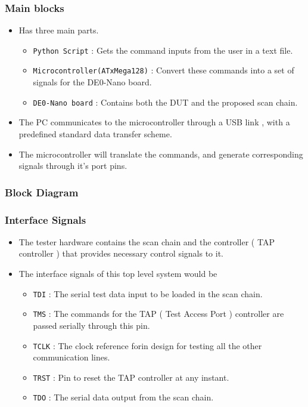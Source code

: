 \documentclass{beamer}
\begin{document}
\begin{frame}
\frametitle{Main blocks}

\begin{itemize}
\item Has three main parts.

\begin{itemize}
\item \texttt{Python Script} : Gets the command inputs from the user in a text file.
\item \texttt{Microcontroller(ATxMega128)} : Convert these commands into a set of signals for the DE0-Nano board.
\item \texttt{DE0-Nano board} : Contains both the DUT and the proposed scan chain.
\end{itemize}

\item The PC communicates to the microcontroller through a USB link , with a predefined standard data transfer scheme.
\item The microcontroller will translate the commands, and generate corresponding signals through it's port pins.
\end{itemize}

\end{frame}

\begin{frame}
\frametitle{Block Diagram}

\begin{figure}[h!]
\centering

\end{figure}

\end{frame}

\begin{frame}
\frametitle{Interface Signals}

\begin{itemize}
\item The tester hardware contains the scan chain and the controller ( TAP controller ) that provides necessary control signals to it.
\item The interface signals of this top level system would be

\begin{itemize}
\item \texttt{TDI} : The serial test data input to be loaded in the scan chain.
\item \texttt{TMS} : The commands for the TAP ( Test Access Port ) controller are passed serially through this pin.
\item \texttt{TCLK} : The clock reference forin design for testing all the other communication lines.
\item \texttt{TRST} : Pin to reset the TAP controller at any instant.
\item \texttt{TDO} : The serial data output from the scan chain.
\end{itemize}

\end{itemize}

\end{frame}
\end{document}
